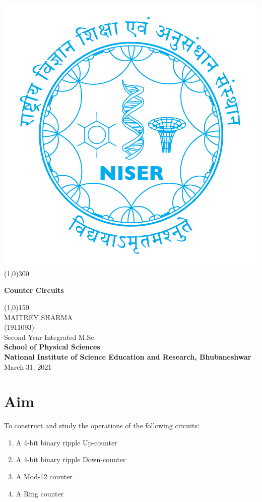 \begin{titlepage}
\begin{center}
\includegraphics[scale=0.15]{Documents/niser.png}
\line(1,0){300}\\
[2mm]
\begin{large}
\textbf{\huge Counter Circuits}\\ 
\end{large}
\line(1,0){150}\\
[5cm]
\large MAITREY SHARMA\\
\small (1911093)\\
[4.5cm]
Second Year Integrated M.Sc.\\
\textbf{School of Physical Sciences}\\
\textbf{National Institute of Science Education and Research, Bhubaneshwar}\\
\small March 31, 2021
\end{center} 
\end{titlepage}
\newpage
\section{Aim}
\noindent
To construct and study the operations of the following circuits:
\begin{enumerate}
    \item A 4-bit binary ripple Up-counter
    \item A 4-bit binary ripple Down-counter
    \item A Mod-12 counter
    \item A Ring counter
\end{enumerate}
